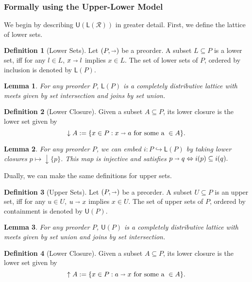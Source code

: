 \documentclass[12pt]{article}
\theoremstyle{definition}
\newtheorem{definition}{Definition}[section]
\theoremstyle{plain}
\newtheorem{lemma}{Lemma}[section]
\theoremstyle{plain}
\theoremstyle{plain}
\theoremstyle{plain}
\theoremstyle{remark}
\theoremstyle{remark}
\newcommand{\mc}[1]{\mathcal{#1}}
\newcommand{\sub}{\subseteq}
\newcommand{\low}{\mathsf{L}}
\newcommand{\upper}{\mathsf{U}}
\begin{document}
\subsubsection{Formally using the Upper-Lower Model}
We begin by describing $\upper(\low(\mc{R}))$ in greater detail. First, we define the lattice of lower sets.

\begin{definition}[Lower Sets]
	Let $(P,\shortrightarrow)$ be a preorder. A subset $L \sub P$ is a lower set, iff for any $l \in L$, $x \shortrightarrow l$ implies $x \in L$. The set of lower sets of $P$, ordered by inclusion is denoted by $\low(P)$. 
\end{definition}

\begin{lemma}
	For any preorder $P$, $\low(P)$ is a completely distributive lattice with meets given by set intersection and joins by set union.
\end{lemma}

\begin{definition}[Lower Closure]
	Given a subset $A \sub P$, its lower closure is the lower set given by $$\downarrow A := \{x \in P: x \shortrightarrow a \text{ for some a } \in A\}.$$
\end{definition} 

\begin{lemma}
	For any preorder $P$, we can embed $i: P \hookrightarrow \low(P)$ by taking lower closures $p \mapsto \downarrow \{p\}$. This map is injective and satisfies $p \shortrightarrow q \Leftrightarrow i(p) \sub i(q).$ 
\end{lemma}

Dually, we can make the same definitions for upper sets.

\begin{definition}[Upper Sets]
	Let $(P,\shortrightarrow)$ be a preorder. A subset $U \sub P$ is an upper set, iff for any $u \in U$, $u \shortrightarrow x$ implies $x \in U$. The set of upper sets of $P$, ordered by containment is denoted by $\upper(P)$. 
\end{definition}

\begin{lemma}
	For any preorder $P$, $\upper(P)$ is a completely distributive lattice with meets given by set union and joins by set intersection.
\end{lemma}

\begin{definition}[Lower Closure]
	Given a subset $A \sub P$, its lower closure is the lower set given by $$\uparrow A := \{x \in P: a \shortrightarrow x \text{ for some a } \in A\}.$$
\end{definition} 
\end{document}
